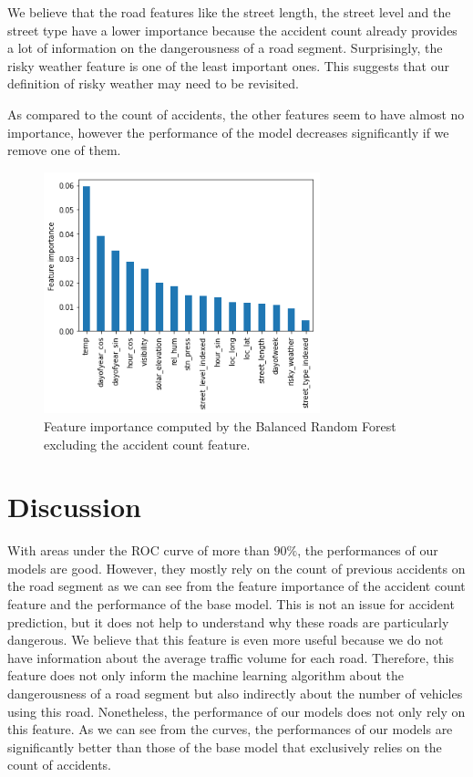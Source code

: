 \documentclass[conference]{IEEEtran}
\begin{document}
We believe that the road features like the street length, the street level and the street type have a lower importance because the accident count already provides a lot of information on the dangerousness of a road segment. Surprisingly, the risky weather feature is one of the least important ones. 
This suggests that our definition of risky weather may need to be revisited.

As compared to the count of accidents, the other features seem to have almost no
importance, however the performance of the model decreases significantly if we
remove one of them. 

\begin{figure}[htbp]
\centerline{\includegraphics[height=7cm, keepaspectratio]{Figures/brf_fi_nocount.png}}
\caption{Feature importance computed by the Balanced Random Forest excluding the accident count feature.}
\label{feature importances}
\end{figure}


\section{Discussion}
\label{sec:discussion}

With areas under the ROC curve of more than $90\%$, the performances of our models are good.
However, they mostly rely on the count of previous accidents on the road segment as we can see from the feature importance of the accident count feature and the performance of the base model.
This is not an issue for accident prediction, but it does not help to 
understand why these roads are particularly dangerous. 
We believe that this feature is even more useful because we do not have information
about the average traffic volume for each road. 
Therefore, this feature does
not only inform the machine learning algorithm about the dangerousness of a road
segment but also indirectly about the number of vehicles using this road.
Nonetheless, the performance of our models does not only rely on this feature.
As we can see from the curves, the performances of our models are significantly
better than those of the base model that exclusively relies on the count of accidents.
\end{document}

